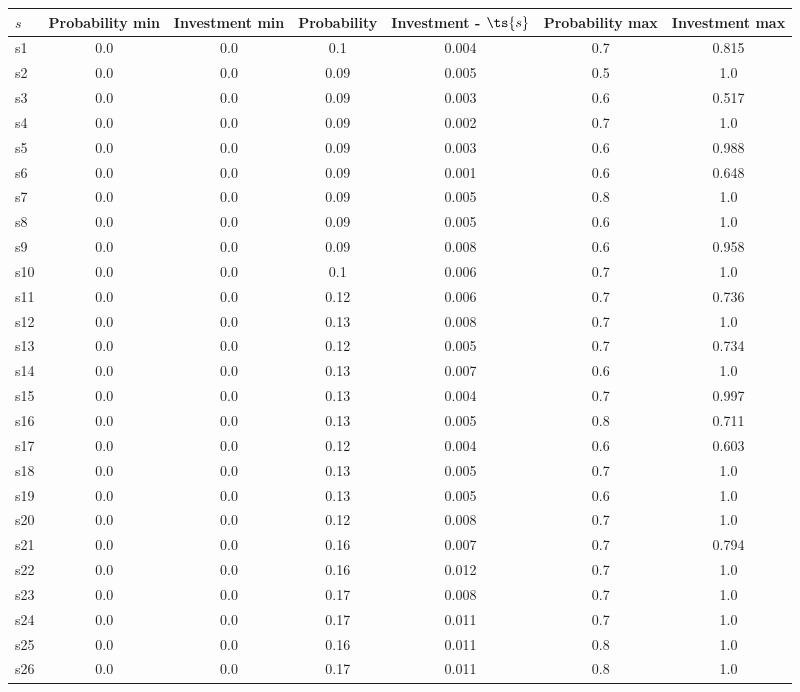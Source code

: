 \documentclass{article}
\begin{document}
\noindent\begin{tabular}{|l|c|c|c|c|c|c|}
\hline
$s$& Probability min & Investment min & Probability & Investment - $\ts{s}$ & Probability max & Investment max\\
\hline
s1 &0.0 & 0.0 & 0.1 & 0.004 & 0.7 & 0.815\\
\hline
s2 &0.0 & 0.0 & 0.09 & 0.005 & 0.5 & 1.0\\
\hline
s3 &0.0 & 0.0 & 0.09 & 0.003 & 0.6 & 0.517\\
\hline
s4 &0.0 & 0.0 & 0.09 & 0.002 & 0.7 & 1.0\\
\hline
s5 &0.0 & 0.0 & 0.09 & 0.003 & 0.6 & 0.988\\
\hline
s6 &0.0 & 0.0 & 0.09 & 0.001 & 0.6 & 0.648\\
\hline
s7 &0.0 & 0.0 & 0.09 & 0.005 & 0.8 & 1.0\\
\hline
s8 &0.0 & 0.0 & 0.09 & 0.005 & 0.6 & 1.0\\
\hline
s9 &0.0 & 0.0 & 0.09 & 0.008 & 0.6 & 0.958\\
\hline
s10 &0.0 & 0.0 & 0.1 & 0.006 & 0.7 & 1.0\\
\hline
s11 &0.0 & 0.0 & 0.12 & 0.006 & 0.7 & 0.736\\
\hline
s12 &0.0 & 0.0 & 0.13 & 0.008 & 0.7 & 1.0\\
\hline
s13 &0.0 & 0.0 & 0.12 & 0.005 & 0.7 & 0.734\\
\hline
s14 &0.0 & 0.0 & 0.13 & 0.007 & 0.6 & 1.0\\
\hline
s15 &0.0 & 0.0 & 0.13 & 0.004 & 0.7 & 0.997\\
\hline
s16 &0.0 & 0.0 & 0.13 & 0.005 & 0.8 & 0.711\\
\hline
s17 &0.0 & 0.0 & 0.12 & 0.004 & 0.6 & 0.603\\
\hline
s18 &0.0 & 0.0 & 0.13 & 0.005 & 0.7 & 1.0\\
\hline
s19 &0.0 & 0.0 & 0.13 & 0.005 & 0.6 & 1.0\\
\hline
s20 &0.0 & 0.0 & 0.12 & 0.008 & 0.7 & 1.0\\
\hline
s21 &0.0 & 0.0 & 0.16 & 0.007 & 0.7 & 0.794\\
\hline
s22 &0.0 & 0.0 & 0.16 & 0.012 & 0.7 & 1.0\\
\hline
s23 &0.0 & 0.0 & 0.17 & 0.008 & 0.7 & 1.0\\
\hline
s24 &0.0 & 0.0 & 0.17 & 0.011 & 0.7 & 1.0\\
\hline
s25 &0.0 & 0.0 & 0.16 & 0.011 & 0.8 & 1.0\\
\hline
s26 &0.0 & 0.0 & 0.17 & 0.011 & 0.8 & 1.0\\

\end{tabular}
\end{document}
